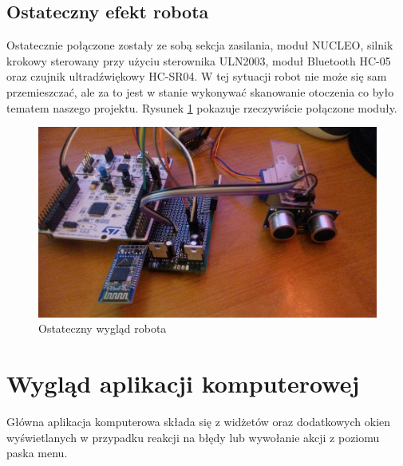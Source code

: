 \documentclass[a4paper]{article}
\begin{document}
\subsection{Ostateczny efekt robota}
Ostatecznie połączone zostały ze sobą sekcja zasilania, moduł NUCLEO, silnik krokowy sterowany przy użyciu sterownika ULN2003, moduł Bluetooth HC-05 oraz czujnik ultradźwiękowy HC-SR04. W tej sytuacji robot nie może się sam przemieszczać, ale za to jest w stanie wykonywać skanowanie otoczenia co było tematem naszego projektu. \newline
Rysunek \ref{prac1} pokazuje rzeczywiście połączone moduły.
\begin{figure}[p]
\centering
\includegraphics[width=\textheight, angle=90]{prac1.jpg}
\caption{Ostateczny wygląd robota}
\label{prac1}
\end{figure}


\section{Wygląd aplikacji komputerowej}
Główna aplikacja komputerowa składa się z widżetów oraz dodatkowych okien wyświetlanych w przypadku reakcji na błędy lub wywołanie akcji z poziomu paska menu.
\end{document}
